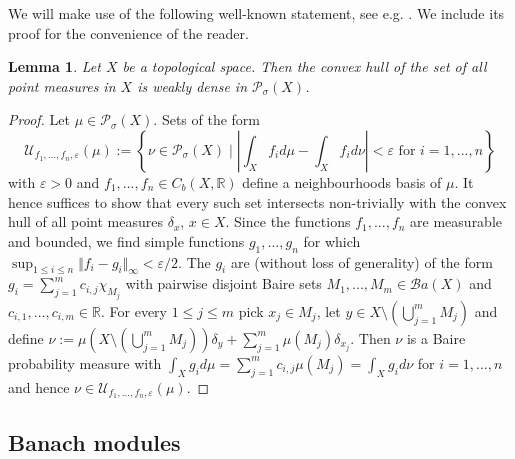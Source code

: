 \documentclass[a4paper,11pt,reqno]{amsart}
\numberwithin{equation}{section}
\newtheorem{lemma}[theorem]{Lemma}
\theoremstyle{definition}
\theoremstyle{remark}
\theoremstyle{remark}
\begin{document}
We will make use of the following well-known statement, see e.g. \cite[Example 4.2.5]{Bogachev}. We include its proof for the convenience of the reader.

\begin{lemma} \label{MeasureDensity} Let $X$ be a topological space. Then the convex hull of the set of all point measures in $X$ is weakly dense in $\mathcal{P}_{\sigma}(X)$. \end{lemma}

\begin{proof} Let $\mu\in\mathcal{P}_{\sigma}(X)$. Sets of the form 
\[
\mathcal{U}_{f_{1},...,f_{n},\varepsilon}(\mu):=\left\{ \nu\in\mathcal{P}_{\sigma}(X)\mid\left|\int_{X}f_{i}d\mu-\int_{X}f_{i}d\nu\right|<\varepsilon\text{ for }i=1,...,n\right\} 
\]
with $\varepsilon>0$ and $f_{1},...,f_{n}\in C_{b}(X,\mathbb{R})$ define a neighbourhoods basis of $\mu$. It hence suffices to show that every such set intersects non-trivially with the convex hull of all point measures $\delta_{x}$, $x\in X$. Since the functions $f_{1},...,f_{n}$ are measurable and bounded, we find simple functions $g_{1},...,g_{n}$ for which $\sup_{1\leq i\leq n}\Vert f_{i}-g_{i}\Vert_{\infty}<\varepsilon/2$. The $g_{i}$ are (without loss of generality) of the form $g_{i}=\sum_{j=1}^{m}c_{i,j}\chi_{M_{j}}$ with pairwise disjoint Baire sets $M_{1},...,M_{m}\in\mathcal{B}a(X)$ and $c_{i,1},...,c_{i,m}\in\mathbb{R}$. For every $1\leq j\leq m$ pick $x_{j}\in M_{j}$, let $y\in X\setminus(\bigcup_{j=1}^{m}M_{j})$ and define $\nu:=\mu\left(X\setminus(\bigcup_{j=1}^{m}M_{j})\right)\delta_{y}+\sum_{j=1}^{m}\mu(M_{j})\delta_{x_{j}}$. Then $\nu$ is a Baire probability measure with $\int_{X}g_{i}d\mu=\sum_{j=1}^{m}c_{i,j}\mu(M_{j})=\int_{X}g_{i}d\nu$ for $i=1,...,n$ and hence $\nu\in\mathcal{U}_{f_{1},...,f_{n},\varepsilon}(\mu).$ \end{proof}

\vspace{3mm}


\subsection{Banach modules}
\end{document}
